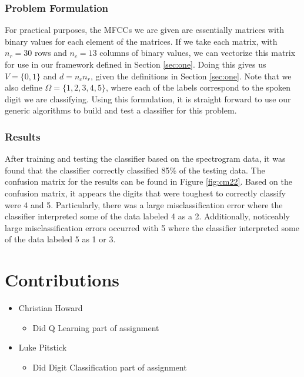 \documentclass{article}[12pt]
\begin{document}
   \subsubsection{Problem Formulation}
   For practical purposes, the MFCCs we are given are essentially matrices with binary values for each element of the matrices. If we take each matrix, with $n_r = 30$ rows and $n_c = 13$ columns of binary values, we can vectorize this matrix for use in our framework defined in Section \ref{sec:one}. Doing this gives us $V = \lbrace 0, 1 \rbrace $ and $d = n_c n_r$, given the definitions in Section \ref{sec:one}. Note that we also define $\Omega = \lbrace 1, 2, 3, 4, 5 \rbrace$, where each of the labels correspond to the spoken digit we are classifying. Using this formulation, it is straight forward to use our generic algorithms to build and test a classifier for this problem.
   
   \subsubsection{Results}
   After training and testing the classifier based on the spectrogram data, it was found that the classifier correctly classified 85\% of the testing data. The confusion matrix for the results can be found in Figure \ref{fig:cm22}. Based on the confusion matrix, it appears the digits that were toughest to correctly classify were 4 and 5. Particularly, there was a large misclassification error where the classifier interpreted some of the data labeled 4 as a 2. Additionally, noticeably large misclassification errors occurred with 5 where the classifier interpreted some of the data labeled 5 as 1 or 3.
   

\newpage
\section{Contributions}
\begin{itemize}
\item Christian Howard
	\begin{itemize}
	\item Did Q Learning part of assignment
	\end{itemize}
\item Luke Pitstick
\begin{itemize}
	\item Did Digit Classification part of assignment
\end{itemize}
\end{itemize}   
   
\end{document}
